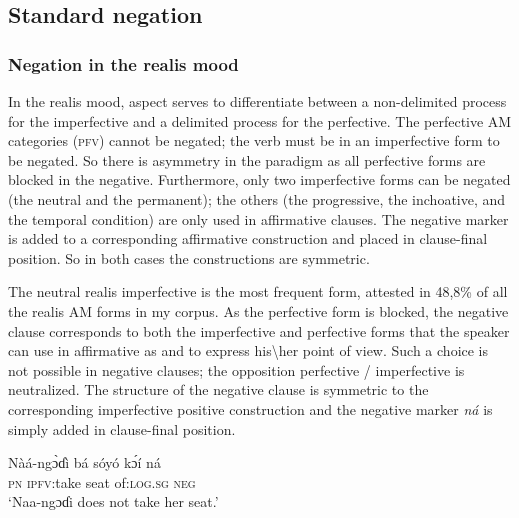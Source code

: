 \documentclass[output=paper,colorlinks=true, citecolor=brown]{langscibook}
\begin{document}
\subsection{Standard negation}\label{sec:gba:2.1}
\subsubsection{Negation in the realis mood}\label{sec:gba:2.1.1}



In the realis mood, aspect serves to differentiate between a non-delimited process for the imperfective and a delimited process for the perfective.
The perfective AM categories (\textsc{pfv}) cannot be negated; the verb must be in an imperfective form to be negated. So there is asymmetry in the paradigm as all perfective forms are blocked in the negative. Furthermore, only two imperfective forms can be negated (the neutral and the permanent); the others (the progressive, the inchoative, and the temporal condition) are only used in affirmative clauses. The negative marker is added to a corresponding affirmative construction and placed in clause-final position. So in both cases the constructions are symmetric. 

The neutral realis imperfective is the most frequent form, attested in 48,8\% of all the realis AM forms in my corpus. As the perfective form is blocked, the negative clause  corresponds to both the imperfective and perfective forms that the speaker can use in affirmative as  and  to express his\textbackslash her point of view. Such a choice is not possible in negative clauses; the opposition perfective / imperfective is neutralized. The structure of the negative clause  is symmetric to the corresponding imperfective positive construction  and the negative marker \textit{ná} is simply added in clause-final position. 

\ea\label{ex:gba:1}
    \gll Nàá-ngɔ̀ɗì bá sóyó kɔ́í ná \\ 
         \textsc{pn} \textsc{ipfv}:take seat of:\textsc{log.sg} \textsc{neg} \\
    \glt ‘Naa-ngɔɗi does not take her seat.’ 
\z 

\end{document}
